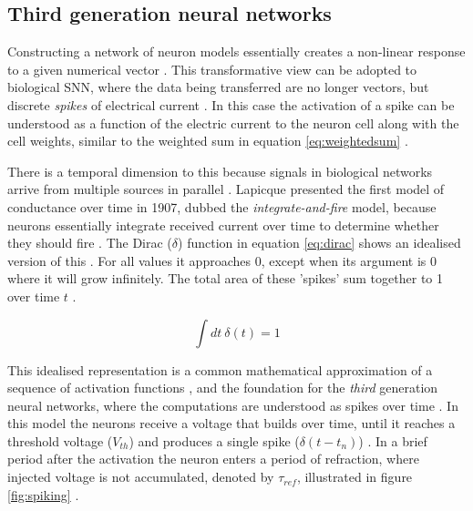\documentclass[report.tex]{subfiles}
\begin{document}
\subsection{Third generation neural networks}
Constructing a network of neuron models essentially creates a non-linear
response to a given numerical vector \cite{Russel2007}.
This transformative view can be adopted to biological \gls{SNN}, where
the data being transferred are no longer vectors, but discrete
\textit{spikes} of electrical current \cite[p. 32]{Dayan2001, Eliasmith2004}.
In this case the activation of a spike can be understood as a function
of the electric current to the neuron cell along with the cell weights,
similar to the weighted sum in equation \ref{eq:weightedsum}
\cite[p. 234]{Dayan2001}.

There is a temporal dimension to this because signals in biological 
networks arrive from multiple sources in parallel \cite{Eliasmith2004}.
Lapicque presented the first model of conductance over time in 1907,
dubbed the \textit{integrate-and-fire} 
model, because neurons essentially
integrate received current over time to determine whether they should fire 
\cite{Dayan2001, Eliasmith2004}.
The Dirac ($\delta$) function 
in equation \ref{eq:dirac} shows an idealised
version of this \cite[p. 404]{Dayan2001}.
For all values it approaches 0, except when its argument is
0 where it will grow infinitely.
The total area of these 'spikes' sum together to 1 over time $t$ .

\begin{equation} \label{eq:dirac}
\int dt\ \delta(t) = 1
\end{equation}

This idealised representation is a common mathematical approximation of
a sequence of activation functions \cite{Dayan2001, Eliasmith2004},
and the foundation for the \textit{third} generation
neural networks, where the computations are understood as spikes over
time \cite{Maass1997}.  
In this model the neurons receive a voltage that builds over time, until
it reaches a threshold voltage ($V_{th}$) and produces a single spike
\mbox{($\delta(t-t_n)$)}
\cite{Dayan2001, Eliasmith2004}.
In a brief period after the activation the neuron enters a period of
refraction, 
where injected voltage is not accumulated, denoted by 
$\tau_{ref}$, illustrated in figure \ref{fig:spiking}
\cite[p. 82]{Eliasmith2004}.
\end{document}
